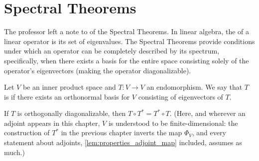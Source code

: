 \renewcommand{\thetheorem}{24.a.\arabic{theorem}}
\setcounter{theorem}{0}
\setcounter{chapter}{23}

\chapter{Spectral Theorems}

\begin{ainote}
The professor left a note to  of the Spectral Theorems. In linear algebra, the  of a linear operator is its set of eigenvalues. The Spectral Theorems provide conditions under which an operator can be completely described by its spectrum, specifically, when there exists a basis for the entire space consisting solely of the operator's eigenvectors (making the operator diagonalizable).
\end{ainote}

\begin{definition}
\label{def:orthogonally_diagonalizable}
Let $V$ be an inner product space and $T \colon V \to V$ an endomorphism. We say that $T$ is  if there exists an orthonormal basis for $V$ consisting of eigenvectors of $T$.
\end{definition}

\begin{lemma}
\label{lem:orth_diag_implies_commute}
If $T$ is orthogonally diagonalizable, then $T \circ T^* = T^* \circ T$. (Here, and wherever an adjoint appears in this chapter, $V$ is understood to be finite-di\-men\-sional: the construction of $T^*$ in the previous chapter inverts the map $\Phi_V$, and every statement about adjoints, \cref{lem:properties_adjoint_map} included, assumes as much.)
\end{lemma}

